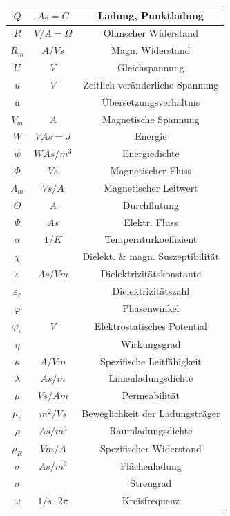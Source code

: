 \documentclass[a4paper, 6pt, landscape]{scrartcl}
\begin{document}
\begin{multicols*}{4}
\begin{tabular}{|c|c|c|}
				$Q$ & $As=C$ & Ladung, Punktladung \\
				\hline
				$R$ & $V/A=\Omega$ & Ohmscher Widerstand \\
				\hline
				$R_m$ & $A/Vs$ & Magn. Widerstand \\
				\hline
				$U$ & $V$ & Gleichspannung \\
				\hline
				$u$ & $V$ & Zeitlich veränderliche Spannung \\
				\hline
				ü & & Übersetzungsverhältnis \\
				\hline
				$V_m$ & $A$ & Magnetische Spannung \\
				\hline
				$W$ & $VAs=J$ & Energie \\
				\hline
				$w$ & $WAs/m^3$ & Energiedichte \\
				\hline
				$\Phi$ & $Vs$ & Magnetischer Fluss \\
				\hline
				$\Lambda_m$ & $Vs/A$ & Magnetischer Leitwert \\
				\hline
				$\Theta$ & $A$ & Durchflutung \\
				\hline
				$\Psi$ & $As$ & Elektr. Fluss \\
				\hline
				$\alpha$ & $1/K$ & Temperaturkoeffizient \\
				\hline
				$\chi$ & & Dielekt. \& magn. Suszeptibilität \\
				\hline
				$\varepsilon$ & $As/Vm$ & Dielektrizitätskonstante \\
				\hline
				$\varepsilon_r$ & & Dielektrizitätszahl \\
				\hline
				$\varphi$ &  & Phasenwinkel \\
				\hline
				$\varphi_e$ & $V$ & Elektrostatisches Potential \\
				\hline
				$\eta$ & & Wirkungsgrad \\
				\hline
				$\kappa$ & $A/Vm$ & Spezifische Leitfähigkeit \\
				\hline
				$\lambda$ & $As/m$ & Linienladungsdichte \\
				\hline
				$\mu$ & $Vs/Am$ & Permeabilität \\
				\hline
				$\mu_e$ & $m^2/Vs$ & Beweglichkeit der Ladungsträger \\
				\hline
				$\rho$ & $As/m^3$ & Raumladungsdichte \\
				\hline
				$\rho_R$ & $Vm/A$ & Spezifischer Widerstand \\
				\hline
				$\sigma$ & $As/m^2$ & Flächenladung \\
				\hline
				$\sigma$ & & Streugrad \\
				\hline
				$\omega$ & $1/s\cdot 2\pi$ & Kreisfrequenz \\
				\hline
				\end{tabular}											
    \end{multicols*}
\setcounter{secnumdepth}{2}
\end{document}
